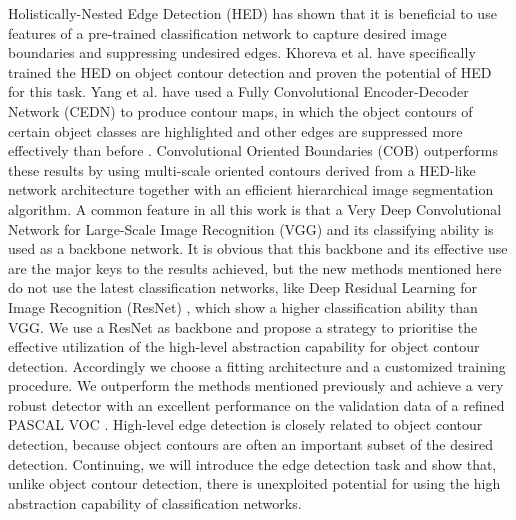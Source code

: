 \documentclass[runningheads]{llncs}
\begin{document}
Holistically-Nested Edge Detection (HED) \cite{HED} has shown that it is beneficial to use features of a pre-trained classification network to capture desired image boundaries and suppressing undesired edges. Khoreva et al. \cite{WeaklySuperObjBound} have specifically trained the HED on object contour detection and proven the potential of HED for this task. Yang et al. have used a Fully Convolutional Encoder-Decoder Network (CEDN) to produce contour maps, in which the object contours of certain object classes are highlighted and other edges are suppressed more effectively than before \cite{CEDN}. Convolutional Oriented Boundaries (COB) \cite{COB} outperforms these results by using multi-scale oriented contours derived from a HED-like network architecture together with an efficient hierarchical image segmentation algorithm. A common feature in all this work is that a Very Deep Convolutional Network for Large-Scale Image Recognition (VGG) \cite{VGG} and its classifying ability is used as a backbone network. It is obvious that this backbone and its effective use are the major keys to the results achieved, but the new methods mentioned here do not use the latest classification networks, like Deep Residual Learning for Image Recognition (ResNet) \cite{ResNet}, which show a higher classification ability than VGG. We use a ResNet as backbone and propose a strategy to prioritise the effective utilization of the high-level abstraction capability for object contour detection. Accordingly we choose a fitting architecture and a customized training procedure. We outperform the methods mentioned previously and achieve a very robust detector with an excellent performance on the validation data of a refined PASCAL VOC \cite{pascal-voc-2012}. 
High-level edge detection is closely related to object contour detection, because object contours are often an important subset of the desired detection. Continuing, we will introduce the edge detection task and show that, unlike object contour detection, there is unexploited potential for using the high abstraction capability of classification networks.
\end{document}
